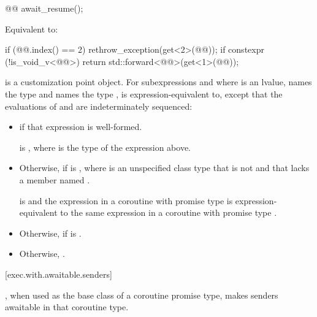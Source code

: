 \begin{itemdecl}
@@ await_resume();
\end{itemdecl}

\begin{itemdescr}
\pnum
\effects
Equivalent to:
\begin{codeblock}
if (@@.index() == 2)
  rethrow_exception(get<2>(@@));
if constexpr (!is_void_v<@@>)
  return std::forward<@@>(get<1>(@@));
\end{codeblock}
\end{itemdescr}

\pnum
{} is a customization point object.
For subexpressions  and 
where  is an lvalue,
 names the type  and
 names the type ,
 is expression-equivalent to,
except that the evaluations of  and 
are indeterminately sequenced:
\begin{itemize}
\item
{} if that expression is well-formed.

\mandates
{} is ,
where  is the type of the expression above.
\item
Otherwise, 
if  is ,
where  is an unspecified class type
that is not  and
that lacks a member named .

\expects
{} is  and
the expression 
in a coroutine with promise type  is expression-equivalent to
the same expression in a coroutine with promise type .
\item
Otherwise, 
if  is .
\item
Otherwise, .
\end{itemize}

[exec.with.awaitable.senders]{}

\pnum
{},
when used as the base class of a coroutine promise type,
makes senders awaitable in that coroutine type.

